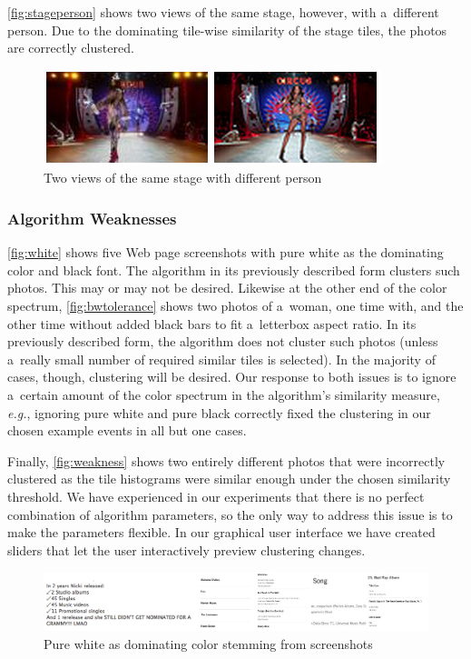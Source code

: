 \autoref{fig:stageperson} shows two views of the same stage,
however, with a~different person.
Due to the dominating tile-wise similarity of the stage tiles,
the photos are correctly clustered.

\begin{figure}[h!]
  \centering
  \includegraphics[width=0.6\linewidth]{./stage.png}
  \caption{Two views of the same stage with different person}
  \label{fig:stageperson}
\end{figure}

\subsubsection{Algorithm Weaknesses}

\autoref{fig:white} shows five Web page screenshots with pure white
as the dominating color and black font.
The algorithm in its previously described form clusters such photos.
This may or may not be desired.
Likewise at the other end of the color spectrum,
\autoref{fig:bwtolerance} shows two photos of a~woman,
one time with, and the other time without added black bars
to fit a~letterbox aspect ratio.
In its previously described form, the algorithm
does not cluster such photos (unless a~really small number
of required similar tiles is selected).
In the majority of cases, though, clustering will be desired.
Our response to both issues is to ignore a~certain amount
of the color spectrum in the algorithm's similarity measure,
\emph{e.g.}, ignoring pure white and pure black correctly fixed
the clustering in our chosen example events in all but one cases.

Finally, \autoref{fig:weakness} shows two entirely different photos
that were incorrectly clustered as the tile histograms
were similar enough under the chosen similarity threshold.
We have experienced in our experiments that there is no perfect
combination of algorithm parameters,
so the only way to address this issue is to make the parameters flexible.
In our graphical user interface we have created sliders
that let the user interactively preview clustering changes. 

\begin{figure}[h!]
  \centering
  \includegraphics[width=0.8\linewidth]{./white.png}
  \caption{Pure white as dominating color stemming from screenshots}
  \label{fig:white}
\end{figure}

